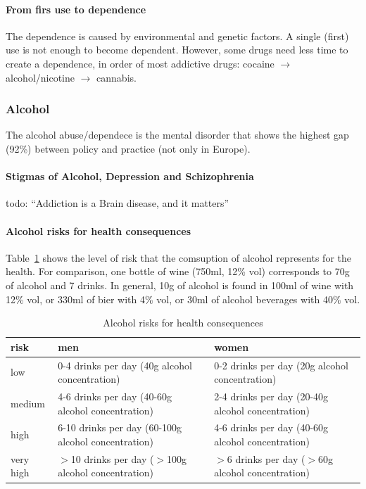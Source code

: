 \documentclass[12pt,article,oneside,a4paper]{memoir}
\begin{document}
\paragraph{From firs use to dependence} 
The dependence is caused by environmental and genetic factors. A single (first)
use is not enough to become dependent.
However, some drugs need less time to create a dependence, in order of most
addictive drugs: cocaine $\rightarrow$ alcohol/nicotine $\rightarrow$ cannabis.

\subsubsection{Alcohol}

The alcohol abuse/dependece is the mental disorder that shows the highest gap
(92\%) between policy and practice (not only in Europe).

\paragraph{Stigmas of Alcohol, Depression and Schizophrenia}
 todo: ``Addiction is a Brain disease, and it matters''

\paragraph{Alcohol risks for health consequences} 

Table~\ref{table:alcohol-risks} shows the level of risk that the comsuption of
alcohol represents for the health. For comparison, one bottle of wine (750ml,
12\% vol) corresponds to 70g of alcohol and 7 drinks. In general, 10g of
alcohol is found in 100ml of wine with 12\% vol, or 330ml of bier with 4\% vol,
or 30ml of alcohol beverages with 40\% vol.

\begin{table}
  \begin{tabular}{ p{4cm} | p{5cm} | p{5cm} }
    \hline
    risk & men & women \\ \hline
	\hline
    low & 0-4 drinks per day (40g alcohol concentration) & 0-2 drinks per day
    (20g alcohol concentration) \\ \hline
    medium & 4-6 drinks per day (40-60g alcohol concentration) & 2-4 drinks per
    day (20-40g alcohol concentration) \\ \hline
    high & 6-10 drinks per day (60-100g alcohol concentration) & 4-6 drinks per
    day (40-60g alcohol concentration) \\ \hline
    very high & $>$10 drinks per day ($>$100g alcohol concentration) & $>$6
    drinks per day ($>$60g alcohol concentration) \\ 
    \hline
  \end{tabular}
  \caption{Alcohol risks for health consequences}
  \label{table:alcohol-risks}
\end{table}
\end{document}
